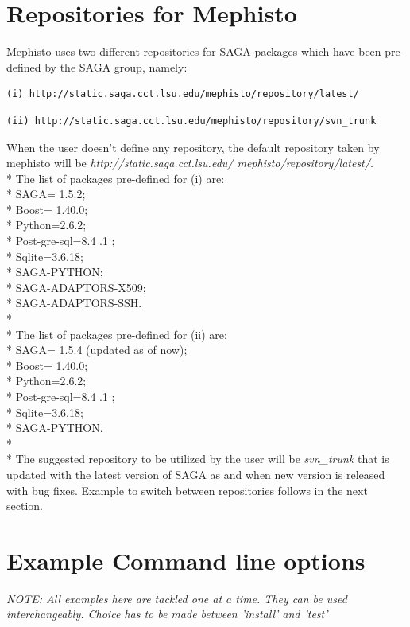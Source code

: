\documentclass[a4paper,10pt]{article}
\begin{document}
\section*{Repositories for Mephisto} 
Mephisto uses two different repositories for SAGA packages which have been
pre-defined by the SAGA group, namely: 
\begin{verbatim}
(i) http://static.saga.cct.lsu.edu/mephisto/repository/latest/
\end{verbatim}
\begin{verbatim}
(ii) http://static.saga.cct.lsu.edu/mephisto/repository/svn_trunk
\end{verbatim}
When the user doesn't define any repository, the default 
repository taken by mephisto will be \emph {http://static.saga.cct.lsu.edu/
mephisto/repository/latest/}. \\*
The list of packages pre-defined for (i) are: \\*
SAGA= 1.5.2; \\*
Boost= 1.40.0; \\*
Python=2.6.2; \\*
Post-gre-sql=8.4 .1 ; \\*
Sqlite=3.6.18;   \\*
SAGA-PYTHON; \\*
SAGA-ADAPTORS-X509; \\*
SAGA-ADAPTORS-SSH.  \\*\\*
The list of packages pre-defined for (ii) are: \\*
SAGA= 1.5.4 (updated as of now); \\*
Boost= 1.40.0; \\*
Python=2.6.2; \\*
Post-gre-sql=8.4 .1 ; \\*
Sqlite=3.6.18;   \\*
SAGA-PYTHON. \\*\\*
The suggested repository to be utilized by the user will be \emph{svn\_trunk} 
that is updated with the latest version of SAGA as and when
new version is released with bug fixes. Example to switch between 
repositories follows in the next section. 
\section*{Example Command line options}
\emph{NOTE: All examples here are tackled one at a time. They can be used interchangeably.
Choice has to be made between 'install' and 'test'}
\end{document}
